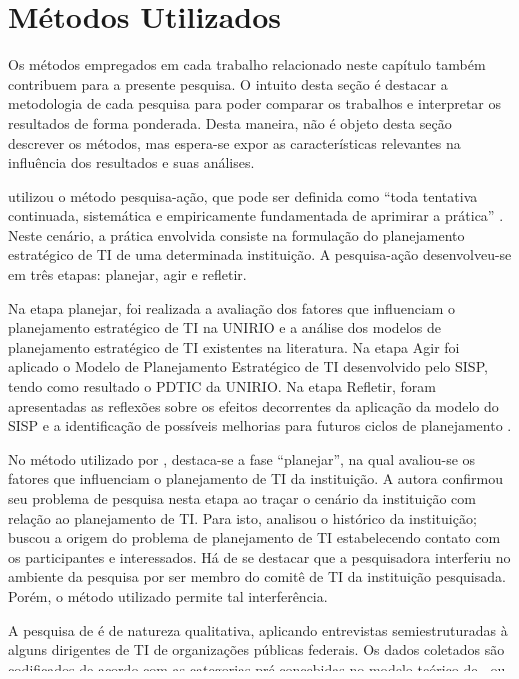 \section{Métodos Utilizados}
Os métodos empregados em cada trabalho relacionado neste capítulo também contribuem para a presente pesquisa. O intuito desta seção é destacar a metodologia de cada pesquisa para poder comparar os trabalhos e interpretar os resultados de forma ponderada. Desta maneira, não é objeto desta seção descrever os métodos, mas espera-se expor as características relevantes na influência dos resultados e suas análises.

 utilizou o método pesquisa-ação, que pode ser definida como ``toda tentativa continuada, sistemática e empiricamente fundamentada de aprimirar a prática'' \cite{tripp:05}. Neste cenário, a prática envolvida consiste na formulação do planejamento estratégico de TI de uma determinada instituição. A pesquisa-ação desenvolveu-se em três etapas: planejar, agir e refletir.

\begin{citacao}
Na etapa planejar, foi realizada a avaliação dos fatores que influenciam o planejamento estratégico de TI na UNIRIO e a análise dos modelos de planejamento estratégico de TI existentes na literatura. Na etapa Agir foi aplicado o Modelo de Planejamento Estratégico de TI desenvolvido pelo SISP, tendo como resultado o PDTIC da UNIRIO. Na etapa Refletir, foram apresentadas as reflexões sobre os efeitos decorrentes da aplicação da modelo do SISP e a identificação de possíveis melhorias para futuros ciclos de planejamento \cite{paula:12}.
\end{citacao}

No método utilizado por , destaca-se a fase ``planejar'', na qual avaliou-se os fatores que influenciam o planejamento de TI da instituição. A autora confirmou seu problema de pesquisa nesta etapa ao traçar o cenário da instituição com relação ao planejamento de TI. Para isto, analisou o histórico da instituição; buscou a origem do problema de planejamento de TI estabelecendo contato com os participantes e interessados. Há de se destacar que a pesquisadora interferiu no ambiente da pesquisa por ser membro do comitê de TI da instituição pesquisada. Porém, o método utilizado permite tal interferência.

A pesquisa de  é de natureza qualitativa, aplicando entrevistas semiestruturadas à alguns dirigentes de TI de organizações públicas federais. Os dados coletados são codificados de acordo com as categorias pré-concebidas no modelo teórico de , ou seja, possui traços de \textit{Grounded Theory}. Desta forma, o pesquisador não apresenta uma teoria fundamentada nos dados, mas uma classificação de códigos de acordo com um modelo teórico fundamentado na literatura.

